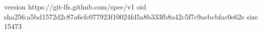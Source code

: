 version https://git-lfs.github.com/spec/v1
oid sha256:a5bd1572d2c87a6cfc077923f10024fd5a8b333fb8a42c5f7c9aebcbfac0e62e
size 15473
